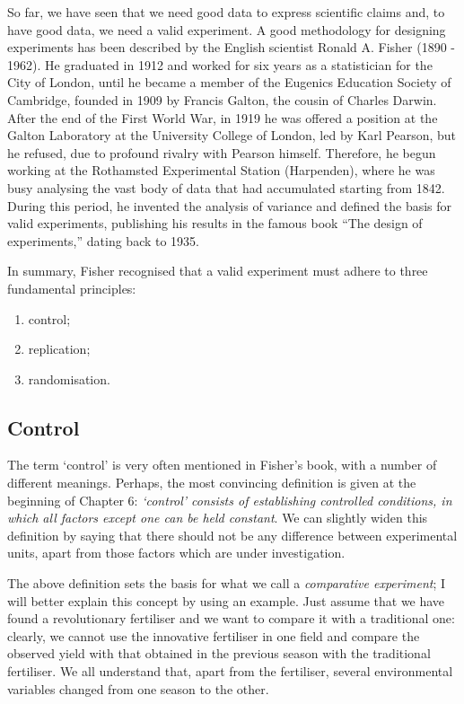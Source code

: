 \documentclass[a4paper,12pt,oneside]{book}
\providecommand{\tightlist}{%
  \setlength{\itemsep}{0pt}\setlength{\parskip}{0pt}}
\begin{document}
So far, we have seen that we need good data to express scientific claims and, to have good data, we need a valid experiment. A good methodology for designing experiments has been described by the English scientist Ronald A. Fisher (1890 - 1962). He graduated in 1912 and worked for six years as a statistician for the City of London, until he became a member of the Eugenics Education Society of Cambridge, founded in 1909 by Francis Galton, the cousin of Charles Darwin. After the end of the First World War, in 1919 he was offered a position at the Galton Laboratory at the University College of London, led by Karl Pearson, but he refused, due to profound rivalry with Pearson himself. Therefore, he begun working at the Rothamsted Experimental Station (Harpenden), where he was busy analysing the vast body of data that had accumulated starting from 1842. During this period, he invented the analysis of variance and defined the basis for valid experiments, publishing his results in the famous book ``The design of experiments,'' dating back to 1935.

In summary, Fisher recognised that a valid experiment must adhere to three fundamental principles:

\begin{enumerate}
\def\labelenumi{\arabic{enumi}.}
\tightlist
\item
  control;
\item
  replication;
\item
  randomisation.
\end{enumerate}

\hypertarget{control}{%
\subsection{Control}\label{control}}

The term `control' is very often mentioned in Fisher's book, with a number of different meanings. Perhaps, the most convincing definition is given at the beginning of Chapter 6: \emph{`control' consists of establishing controlled conditions, in which all factors except one can be held constant}. We can slightly widen this definition by saying that there should not be any difference between experimental units, apart from those factors which are under investigation.

The above definition sets the basis for what we call a \emph{comparative experiment}; I will better explain this concept by using an example. Just assume that we have found a revolutionary fertiliser and we want to compare it with a traditional one: clearly, we cannot use the innovative fertiliser in one field and compare the observed yield with that obtained in the previous season with the traditional fertiliser. We all understand that, apart from the fertiliser, several environmental variables changed from one season to the other.
\end{document}
